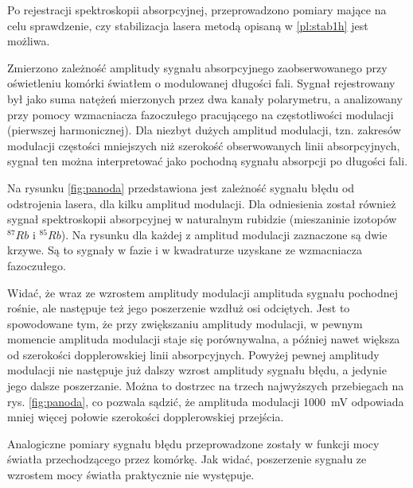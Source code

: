 \documentclass[a4paper,10pt,twoside]{report}
\begin{document}
Po rejestracji spektroskopii absorpcyjnej, przeprowadzono pomiary mające na celu sprawdzenie, czy stabilizacja lasera metodą opisaną w \ref{pl:stab1h} jest możliwa.

Zmierzono zależność amplitudy sygnału absorpcyjnego zaobserwowanego przy oświetleniu komórki światłem o modulowanej długości fali. Sygnał rejestrowany był jako suma natężeń mierzonych przez dwa kanały polarymetru, a analizowany przy pomocy wzmacniacza fazoczułego pracującego na częstotliwości modulacji (pierwszej harmonicznej). Dla niezbyt dużych amplitud modulacji, tzn. zakresów modulacji częstości mniejszych niż szerokość obserwowanych linii absorpcyjnych, sygnał ten można interpretować jako pochodną sygnału absorpcji po długości fali.

Na rysunku \ref{fig:panoda} przedstawiona jest zależność sygnału błędu od odstrojenia lasera, dla kilku amplitud modulacji. Dla odniesienia został również sygnał spektroskopii absorpcyjnej w naturalnym rubidzie (mieszaninie izotopów ${}^87Rb$ i ${}^85Rb$).
Na rysunku dla każdej z amplitud modulacji zaznaczone są dwie krzywe. Są to sygnały w fazie i w kwadraturze uzyskane ze wzmacniacza fazoczułego.

Widać, że wraz ze wzrostem amplitudy modulacji amplituda sygnału pochodnej rośnie, ale następuje też jego poszerzenie wzdłuż osi odciętych. Jest to spowodowane tym, że przy zwiększaniu amplitudy modulacji, w pewnym momencie amplituda modulacji staje się porównywalna, a później nawet większa od szerokości dopplerowskiej linii absorpcyjnych.  Powyżej pewnej amplitudy modulacji nie następuje już dalszy wzrost amplitudy sygnału błędu, a jedynie jego dalsze poszerzanie. Można to dostrzec na trzech najwyższych przebiegach na rys. \ref{fig:panoda}, co pozwala sądzić, że amplituda modulacji 1000~mV odpowiada mniej więcej połowie szerokości dopplerowskiej przejścia.


Analogiczne pomiary sygnału błędu przeprowadzone zostały w funkcji mocy światła przechodzącego przez komórkę. Jak widać, poszerzenie sygnału ze wzrostem mocy światła praktycznie nie występuje. 

\end{document}
